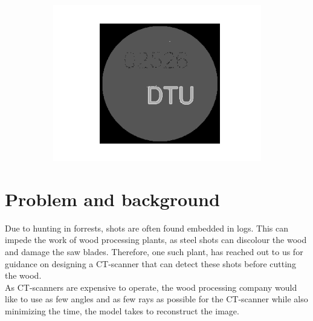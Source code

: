 \documentclass{article}
\begin{document}
\begin{figure}[H]
\begin{subfigure}[t]{0.5\linewidth}
\centering
\includegraphics[width=\linewidth]{code/test_logo_kmeans.png}
\end{subfigure}


\clearpage
{} 
\vspace{10pt}

\label{fig:front_page}
\end{figure}
\clearpage
{} 
\newpage


\section{Problem and background} 
Due to hunting in forrests, shots are often found embedded in logs. This can impede the work of wood processing plants, as steel shots can discolour the wood and damage the saw blades. Therefore, one such plant, has reached out to us for guidance on designing a CT-scanner that can detect these shots before cutting the wood. \\
As CT-scanners are expensive to operate, the wood processing company would like to use as few angles and as few rays as possible for the CT-scanner while also minimizing the time, the model takes to reconstruct the image.
\end{document}
